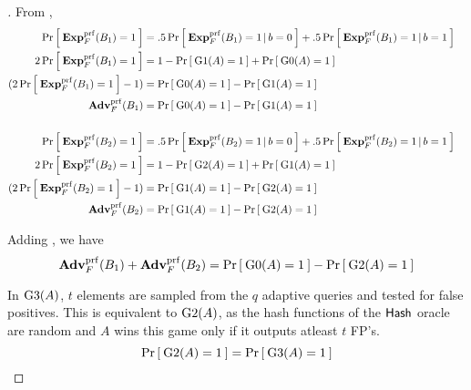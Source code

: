 \begin{proof}[]
%
\noindent
From , %
\begin{align}
\nonumber \Prob{\ExpPRF{F}{B_1} = 1} &= .5\Prob{\ExpPRF{F}{B_1}=1\,|\,b=0} + .5\Prob{\ExpPRF{F}{B_1} = 1\,|\,b=1}\\
\nonumber 2\Prob{\ExpPRF{F}{B_1} = 1} &= 1-\Prob{\game{1}(A)=1} + \Prob{\game{0}(A)=1}\\
\nonumber (2\Prob{\ExpPRF{F}{B_1} = 1} - 1)  &= \Prob{\game{0}(A)=1} - \Prob{\game{1}(A)=1}\\
 \AdvPRF{F}{B_1} &= \Prob{\game{0}(A)=1} - \Prob{\game{1}(A)=1} \label{eq:1}\\
\nonumber& &\\
\nonumber \Prob{\ExpPRF{F}{B_2} = 1} &= .5\Prob{\ExpPRF{F}{B_2}=1\,|\,b=0} + .5\Prob{\ExpPRF{F}{B_2} = 1\,|\,b=1}\\
\nonumber 2\Prob{\ExpPRF{F}{B_2} = 1} &= 1-\Prob{\game{2}(A)=1} + \Prob{\game{1}(A)=1}\\
\nonumber (2\Prob{\ExpPRF{F}{B_2} = 1} - 1)  &= \Prob{\game{1}(A)=1} - \Prob{\game{2}(A)=1}\\
 \AdvPRF{F}{B_2} &= \Prob{\game{1}(A)=1} - \Prob{\game{2}(A)=1} \label{eq:2a}
\end{align}

\noindent
Adding , we have
\begin{equation}
\AdvPRF{F}{B_1} +\AdvPRF{F}{B_2} = \Prob{\game{0}(A)=1} - \Prob{\game{2}(A)=1}\label{eq:2}
\end{equation}

\noindent
In $\game{3}(A)$, $t$ elements are sampled from the $q$ adaptive queries and tested for false positives. This is equivalent to $\game{2}(A)$, as the hash functions of the $\HashOracle$ oracle are random and $A$ wins this  game only if it outputs atleast $t$ FP's.
\begin{equation}
\Prob{\game{2}(A)=1} = \Prob{\game{3}(A)=1}\label{eq:3}
\end{equation}


\end{proof}
